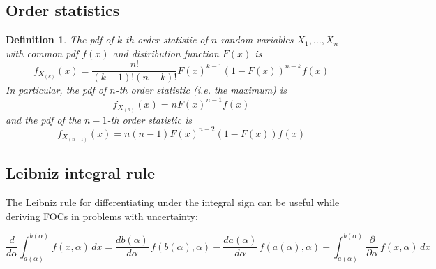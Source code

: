 \documentclass[letter, 10pt]{article}
\theoremstyle{basic}
\newtheorem{definition}{Definition}[section]
\begin{document}
\begin{spacing}{1.1}
\subsection{Order statistics}

\begin{definition}
  The pdf of $k$-th order statistic of $n$ random variables $X_1, \ldots, X_n$
  with common pdf $f(x)$ and distribution function $F(x)$ is \[f_{X_{(k)}}(x) =
  \frac{n!}{(k-1)!(n-k)!}F(x)^{k-1}\left(1-F(x)\right)^{n-k} f(x)\] In
  particular, the pdf of $n$-th order statistic (i.e. the maximum)
  is \[f_{X_{(n)}}(x) = n F(x)^{n-1} f(x)\] and the pdf of the $n-1$-th order
  statistic is \[f_{X_{(n-1)}}(x) = n(n-1) F(x)^{n-2} \left(1-F(x)\right) f(x)\]
\end{definition}

\subsection{Leibniz integral rule}

The Leibniz rule for differentiating under the integral sign can be useful while
deriving FOCs in problems with uncertainty:

\[\frac{d}{d\alpha}\int_{a(\alpha)}^{b(\alpha)} f(x,\alpha)\,dx = \frac{d b(\alpha)}{d \alpha}\,f(b(\alpha),\alpha)-\frac{d a(\alpha)}{d \alpha}\,f(a(\alpha),\alpha)+ \int_{a(\alpha)}^{b(\alpha)}\frac{\partial}{\partial \alpha}\,f(x,\alpha)\,dx\]

\end{spacing}
\end{document}
